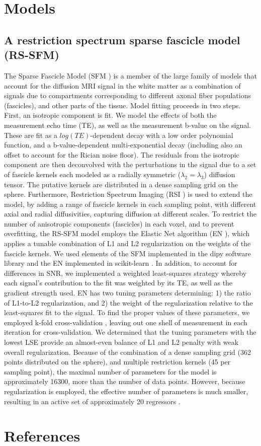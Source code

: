 \documentclass[3p]{elsarticle}
\begin{document}
\section{Models}

\subsection{A restriction spectrum sparse fascicle model (RS-SFM)}

The Sparse Fascicle Model (SFM \cite{Rokem2015}) is a member of the large family of models that account for the diffusion MRI signal in the white matter as a combination of signals due to compartments corresponding to different axonal fiber populations (fascicles), and other parts of the tissue. Model fitting proceeds in two steps. First, an isotropic component is fit. We model the effects of both the measurement echo time (TE), as well as the measurement b-value on the signal. These are fit as a $log(TE)$-dependent decay with a low order polynomial function, and a b-value-dependent multi-exponential decay (including also an offset to account for the Rician noise floor). The residuals from the isotropic component are then deconvolved with the perturbations in the signal due to a set of fascicle kernels each modeled as a radially symmetric ($\lambda_2=\lambda_3$) diffusion tensor. The putative kernels are distributed in a dense sampling grid on the sphere. Furthermore, Restriction Spectrum Imaging (RSI \cite{White2013}) is used to extend the model, by adding a range of fascicle kernels in each sampling point, with different axial and radial diffusivities, capturing diffusion at different scales. To restrict the number of anisotropic components (fascicles) in each voxel, and to prevent overfitting, the RS-SFM model employs the Elastic Net algorithm (EN \cite{Zou2005}), which applies a tunable combination of L1 and L2 regularization on the weights of the fascicle kernels. We used elements of the SFM implemented in the dipy software library \cite{Garyfallidis2014} and the EN implemented in scikit-learn \cite{pedregosa2011}. In addition, to account for differences in SNR, we implemented a weighted least-squares strategy whereby each signal’s contribution to the fit was weighted by its TE, as well as the gradient strength used. EN has two tuning parameters determining: 1) the ratio of L1-to-L2 regularization, and 2) the weight of the regularization relative to the least-squares fit to the signal. To find the proper values of these parameters, we employed k-fold cross-validation \cite{Rokem2015}, leaving out one shell of measurement in each iteration for cross-validation. We determined that the tuning parameters with the lowest LSE \cite{Panagiotaki2012} provide an almost-even balance of L1 and L2 penalty with weak overall regularization. Because of the combination of a dense sampling grid (362 points distributed on the sphere), and multiple restriction kernels (45 per sampling point), the maximal number of parameters for the model is approximately 16300, more than the number of data points. However, because regularization is employed, the effective number of parameters is much smaller, resulting in an active set of approximately 20 regressors \cite{Zou2007}.

\section*{References}

\end{document}
